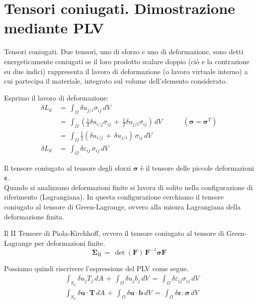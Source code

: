 \section{Tensori coniugati. Dimostrazione mediante PLV}

\begin{definizioneBox}
Tensori coniugati. Due tensori, uno di sforzo e uno di deformazione, sono detti energeticamente coniugati
se il loro prodotto scalare doppio (ciò e la contrazione su due indici) rappresenta il lavoro di
deformazione (o lavoro virtuale interno) a cui partecipa il materiale, integrato sul volume
dell'elemento considerato.
\end{definizioneBox}
Esprimo  il lavoro di deformazione:
\begin{align*}
    \delta L_d \, &=\,  \int_{\Omega} \delta u_{j/i}  \sigma_{ij}  \, dV  \\
    &= \,  \int_{\Omega}  \left( \frac{1}{2} \delta u_{i/j}  \sigma_{ij} \, + \,        \frac{1}{2} \delta u_{j/i}  \sigma_{ij} \right) \, dV  
    \quad\quad\quad \left( \boldsymbol{\sigma} = \boldsymbol{\sigma}^T \right)\\
    &=  \,  \int_{\Omega}  \frac{1}{2} \left( \delta u_{i/j}  \, + \,       \delta u_{j/i}  \right)\,\sigma_{ij}  \, dV  \\
     \delta L_d \, &= \,  \int_{\Omega}  \delta \varepsilon_{ij}  \,\sigma_{ij}  \, dV 
\end{align*}

Il tensore coniugato al tensore degli sforzi $\boldsymbol{\sigma}$ è il tensore delle piccole deformazioni $\boldsymbol{\varepsilon}$.\\

Quando si analizzano deformazioni finite si lavora di solito nella configurazione di riferimento (Lagrangiana). In questa configurazione cerchiamo il tensore coniugato al tensore di Green-Lagrange, ovvero alla misura Lagrangiana della deformazione finita. 

\begin{definizioneBox}
    Il II Tensore di Piola-Kirchhoff, ovvero il tensore coniugato al tensore di Green-Lagrange per deformazioni finite.
    \begin{equation*}
        \boldsymbol{\Sigma}_{\mathrm{II}} \,= \, \det (\boldsymbol{F} )\, \boldsymbol{F}^{-1} \boldsymbol{\sigma} \boldsymbol{F}
    \end{equation*}
\end{definizioneBox}

Possiamo quindi riscrivere l'espressione del PLV come segue.
\begin{align*}
     & \int_{S_{\sigma}}  \delta u_j T_j \, dA  \, +\,\int_{\Omega} \delta u_{j}  b_j  \, dV \, = \, \int_{\Omega} \delta \varepsilon_{ij}  \sigma_{ij}  \, dV   \\
    &  \int_{S_{\sigma}} \delta \mathbf{u} \cdot \mathbf{T} \, dA 
    \,+\, \int_{\Omega} \delta \mathbf{u} \cdot \mathbf{b} \, dV 
    \,=\, \int_{\Omega} \delta \boldsymbol{\varepsilon} : \boldsymbol{\sigma} \, dV
\end{align*}








